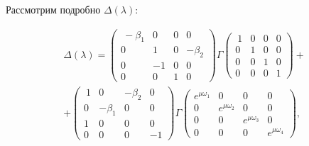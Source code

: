   

\smallskip  

  

Рассмотрим подробно $\Delta(\lambda)$:

\begin{multline}

\Delta(\lambda)=

\begin{pmatrix}

\ -\beta_1 & 0 & 0 & 0 \\

0  & 1 & 0 & -\beta_2\\

0& -1 & 0 & 0\\

0 & 0 & 1 & 0

\end{pmatrix}\Gamma\begin{pmatrix}

\ 1 & 0 & 0 & 0 \\

0  & 1 & 0 & 0\\

0& 0 & 1 & 0\\

0 & 0 & 0 & 1

\end{pmatrix}+

\\

+\begin{pmatrix}

\ 1 & 0 & -\beta_2 & 0 \\

0  & -\beta_1 & 0 & 0\\

1 & 0 & 0 & 0\\

0 & 0 & 0 & -1

\end{pmatrix}\Gamma\begin{pmatrix}

 e^{\mu\omega_1} & 0 & 0 & 0 \\

0  & e^{\mu\omega_2} & 0 & 0\\

0& 0 & e^{\mu\omega_3} & 0\\

0 & 0 & 0 & e^{\mu\omega_4}

\end{pmatrix},

\end{multline}

